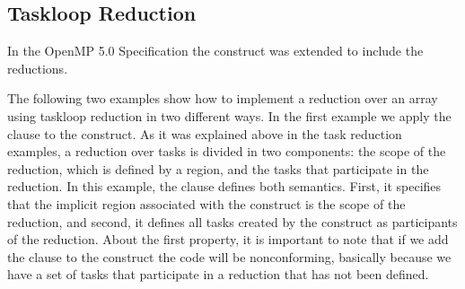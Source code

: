 


\subsection{Taskloop Reduction}
\label{subsec:taskloop_reduction}

In the OpenMP 5.0 Specification the  construct
was extended to include the reductions.

The following two examples show how to implement a reduction over an array
using taskloop reduction in two different ways.
In the first
example we apply the  clause to the  construct. As it was
explained above in the task reduction examples, a reduction over tasks is
divided in two components: the scope of the reduction, which is defined by a
 region, and the tasks that participate in the reduction. In this
example, the  clause defines both semantics. First, it specifies that
the implicit  region associated with the  construct is the scope of the
reduction, and second, it defines all tasks created by the  construct as
participants of the reduction. About the first property, it is important to note
that if we add the  clause to the  construct the code will be
nonconforming, basically because we have a set of tasks that participate in a
reduction that has not been defined.



